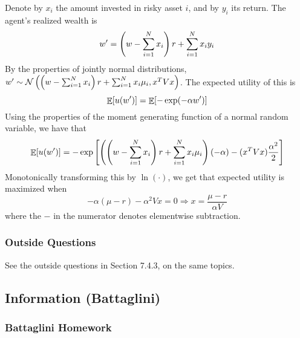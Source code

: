 \documentclass[12pt]{article}
\begin{document}
\begin{itemize}
	Denote by $x_i$ the amount invested in risky asset $i$, and by $y_i$ its return. The agent's realized wealth is
	\[
	w' = \left( w - \sum_{i=1}^N x_i\right) r + \sum_{i=1}^N x_i y_i
	\]
	By the properties of jointly normal distributions, $w' \sim \mathcal{N}\left( \left( w - \sum_{i=1}^N x_i\right) r + \sum_{i=1}^N x_i \mu_i, x^{T} V x\right)$. The expected utility of this is
	\[
	\mathop{\mathbb{E}}[u(w')] = \mathop{\mathbb{E}}[-\exp(-\alpha w')]
	\]
	Using the properties of the moment generating function of a normal random variable, we have that
	\[
	\mathop{\mathbb{E}}[u(w')] = -\exp\left[\left( \left( w - \sum_{i=1}^N x_i\right) r + \sum_{i=1}^N x_i \mu_i\right)(-\alpha) - (x^T Vx) \frac{\alpha^2}{2}\right]
	\]
	Monotonically transforming this by $\ln(\cdot)$, we get that expected utility is maximized when
	\[
	-\alpha (\mu - r) - \alpha^2 Vx = 0 \Longrightarrow x = \frac{\mu - r}{\alpha V}
	\]
	where the $-$ in the numerator denotes elementwise subtraction.
\end{itemize}
\subsubsection{Outside Questions}

See the outside questions in Section 7.4.3, on the same topics.

\newpage
\subsection{Information (Battaglini)}

\subsubsection{Battaglini Homework}
\end{document}
